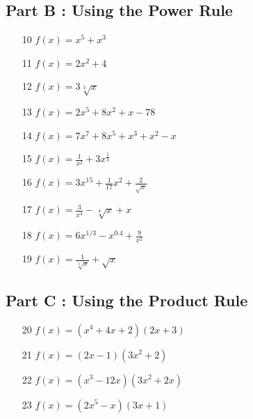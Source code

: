 \documentclass[]{article}
\begin{document}
\subsection*{Part B : Using the Power Rule}
{
	\Large
	\begin{multicols}{2}
		\begin{itemize}
			\item[10] $f(x) = x^5 + x^3 $
			\item[11] $ f(x) = 2x^2 + 4$ 
			\item[12] $ f(x) = 3\sqrt[3]{x}$ 
			\item[13] $ f(x) = 2x^5+8x^2+x-78$ 
			\item[14] $ f(x) = 7x^7+8x^5+x^3+x^2-x$ \,
			\item[15] $ f(x) = \frac{1}{x^2}+3x^\frac{1}{3}$ \,
			\item[16] $ f(x) = 3x^{15} + \frac{1}{17}x^2 +\frac{2}{\sqrt{x}} $ \,
			\item[17] $ f(x) = \frac{3}{x^4} - \sqrt[4]{x} + x $ \,
			\item[18] $ f(x) = 6x^{1/3}-x^{0.4} +\frac{9}{x^2} $ 
			\item[19] $ f(x) = \frac{1}{\sqrt[3]{x}} + \sqrt{x} $ 
		\end{itemize}
	\end{multicols}
}
\bigskip
\subsection*{Part C : Using the Product Rule}
{
	\Large
	\begin{multicols}{2}
		\begin{itemize}
			\item[20] $ f(x) = (x^4+4x+2)(2x+3) $ \,
			\item[21] $ f(x) = (2x-1)(3x^2+2) $ \,
			\item[22] $ f(x) = (x^3-12x)(3x^2+2x) $ \,
			\item[23] $ f(x) = (2x^5-x)(3x+1) $ \,
		\end{itemize}
	\end{multicols}
}
\bigskip
\end{document}

